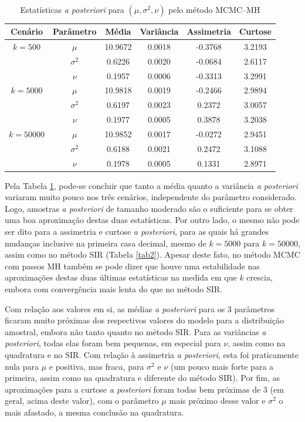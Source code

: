 \begin{table}[htb]
	\caption{Estatísticas \textit{a posteriori} para $(\mu, \sigma^2, \nu)$ pelo método MCMC--MH}
	\label{tab3}
	\centering
	\begin{tabular}{cccccc}
		\toprule
		Cenário & Parâmetro & Média & Variância & Assimetria & Curtose \\
		\midrule
		$k = 500$ & $\mu$ & 10.9672 & 0.0018 & -0.3768 & 3.2193 \\
		& $\sigma^2$ & 0.6226 & 0.0020 & -0.0684 & 2.6117 \\
		& $\nu$      & 0.1957 & 0.0006 & -0.3313 & 3.2991 \\
		\midrule
		$k = 5000$ & $\mu$ & 10.9818 & 0.0019 & -0.2466 & 2.9894 \\
		& $\sigma^2$ & 0.6197 & 0.0023 & 0.2372 & 3.0057 \\
		& $\nu$      & 0.1977 & 0.0005 & 0.3878 & 3.2038 \\
		\midrule
		$k = 50000$ & $\mu$ & 10.9852 & 0.0017 & -0.0272 & 2.9451 \\
		& $\sigma^2$ & 0.6188 & 0.0021 & 0.2472 & 3.1088 \\
		& $\nu$      & 0.1978 & 0.0005 & 0.1331 & 2.8971 \\
		\bottomrule
	\end{tabular}
\end{table}

Pela Tabela \ref{tab3}, pode-se concluir que tanto a média quanto a variância \textit{a posteriori} variaram muito pouco nos três cenários, independente do parâmetro considerado. Logo, amostras \textit{a posteriori} de tamanho moderado são o suficiente para se obter uma boa aproximação destas duas estatísticas. Por outro lado, o mesmo não pode ser dito para a assimetria e curtose \textit{a posteriori}, para as quais há grandes mudanças inclusive na primeira casa decimal, mesmo de $k=5000$ para $k=50000$, assim como no método SIR (Tabela \ref{tab2}). Apesar deste fato, no método MCMC com passos MH também se pode dizer que houve uma estabilidade nas aproximações destas duas últimas estatísticas na medida em que $k$ crescia, embora com convergência mais lenta do que no método SIR.

Com relação aos valores em si, as médias \textit{a posteriori} para os 3 parâmetros ficaram muito próximas dos respectivos valores do modelo para a distribuição amostral, embora não tanto quanto no método SIR. Para as variâncias \textit{a posteriori}, todas elas foram bem pequenas, em especial para $\nu$, assim como na quadratura e no SIR. Com relação à assimetria \textit{a posteriori}, esta foi praticamente nula para $\mu$ e positiva, mas fraca, para $\sigma^2$ e $\nu$ (um pouco mais forte para a primeira, assim como na quadratura e diferente do método SIR). Por fim, as aproximações para a curtose \textit{a posteriori} foram todas bem próximas de 3 (em geral, acima deste valor), com o parâmetro $\mu$ mais próximo desse valor e $\sigma^2$ o mais afastado, a mesma conclusão na quadratura.

